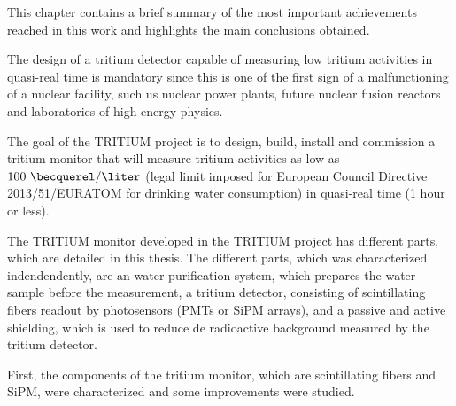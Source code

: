 This chapter contains a brief summary of the most important achievements reached in this work and highlights the main conclusions obtained.

The design of a tritium detector capable of measuring low tritium activities in quasi-real time is mandatory since this is one of the first sign of a malfunctioning of a nuclear facility, such us nuclear power plants, future nuclear fusion reactors and laboratories of high energy physics.

The goal of the TRITIUM project is to design, build, install and commission a tritium monitor that will measure tritium activities as low as $100~\becquerel/\liter$ (legal limit imposed for European Council Directive 2013/51/EURATOM for drinking water consumption) in quasi-real time (1 hour or less).

The TRITIUM monitor developed in the TRITIUM project has different parts, which are detailed in this thesis. The different parts, which was characterized indendendently, are an water purification system, which prepares the water sample before the measurement, a tritium detector, consisting of scintillating fibers readout by photosensors (PMTs or SiPM arrays), and a passive and active shielding, which is used to reduce de radioactive background measured by the tritium detector.

First, the components of the tritium monitor, which are scintillating fibers and SiPM, were characterized and some improvements were studied.

